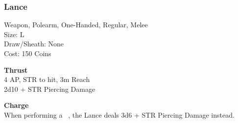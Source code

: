 \subsubsection{Lance}\label{weapon:lance}
Weapon, Polearm, One-Handed, Regular, Melee\\
Size: L\\
Draw/Sheath: None\\
Cost: 150 Coins

\textbf{Thrust}\\
4 AP, STR to hit, 3m Reach\\
2d10 + \texttimes STR Piercing Damage

\textbf{Charge}\\
When performing a ~, the Lance deals 3d6 + \texttimes STR Piercing Damage instead.